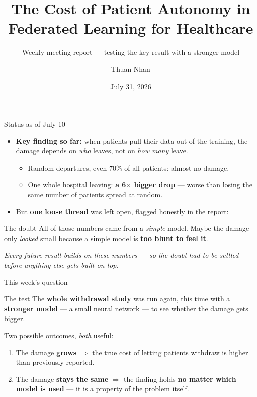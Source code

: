 \documentclass[aspectratio=169]{beamer}
\title[Cost of Patient Autonomy in Federated Learning]{The Cost of Patient Autonomy in\\Federated Learning for Healthcare}
\subtitle{Weekly meeting report --- testing the key result with a stronger model}
\author{Thuan Nhan}
\institute{Ph.D.\ Program in Data Science}
\date{July 31, 2026}
\begin{document}
\begin{frame}[plain]\titlepage\end{frame}

\begin{frame}{Status as of July 10}
\begin{itemize}
\item \textbf{Key finding so far:} when patients pull their data out of the training,
the damage depends on \emph{who} leaves, not on \emph{how many} leave.
\begin{itemize}
  \item Random departures, even 70\% of all patients: almost no damage.
  \item One whole hospital leaving: \textcolor{mCoral}{\textbf{a 6$\times$ bigger drop}} ---
        worse than losing the same number of patients spread at random.
\end{itemize}
\item But \textbf{one loose thread} was left open, flagged honestly in the report:
\end{itemize}
\vfill
\begin{alertblock}{The doubt}
All of those numbers came from a \emph{simple} model. Maybe the damage only
\emph{looked} small because a simple model is \textbf{too blunt to feel it}.
\end{alertblock}
\vfill
{\footnotesize\textit{Every future result builds on these numbers --- so the doubt had to be
settled before anything else gets built on top.}}
\end{frame}

\begin{frame}{This week's question}
\begin{block}{The test}
The \textbf{whole withdrawal study} was run again, this time with a \textbf{stronger
model} --- a small neural network --- to see whether the damage gets bigger.
\end{block}
\vfill
Two possible outcomes, \emph{both} useful:
\begin{enumerate}
\item The damage \textbf{grows} $\Rightarrow$ the true cost of letting patients withdraw
      is higher than previously reported.
\item The damage \textbf{stays the same} $\Rightarrow$ the finding holds \textbf{no matter
      which model is used} --- it is a property of the problem itself.
\end{enumerate}
\end{frame}
\end{document}
